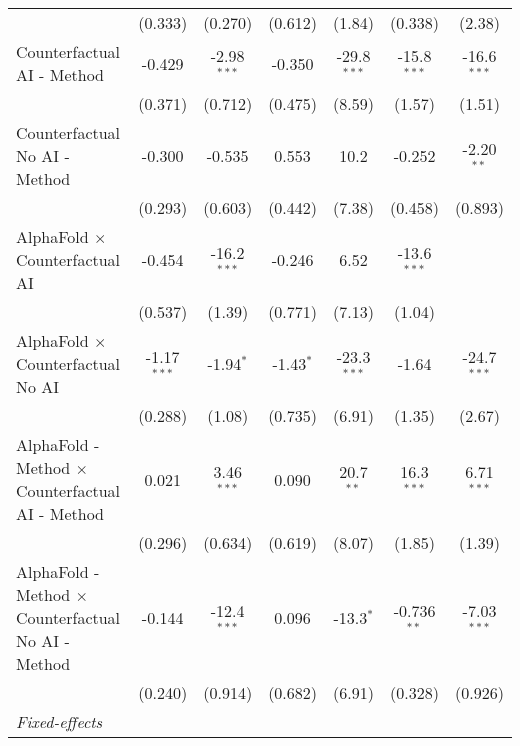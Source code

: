 \begin{tabular}{lcccccc}
                                                              & (0.333)       & (0.270)       & (0.612)     & (1.84)        & (0.338)       & (2.38)\\   
   Counterfactual AI - Method                                 & -0.429        & -2.98$^{***}$ & -0.350      & -29.8$^{***}$ & -15.8$^{***}$ & -16.6$^{***}$\\   
                                                              & (0.371)       & (0.712)       & (0.475)     & (8.59)        & (1.57)        & (1.51)\\   
   Counterfactual No AI - Method                              & -0.300        & -0.535        & 0.553       & 10.2          & -0.252        & -2.20$^{**}$\\   
                                                              & (0.293)       & (0.603)       & (0.442)     & (7.38)        & (0.458)       & (0.893)\\   
   AlphaFold $\times$ Counterfactual AI                       & -0.454        & -16.2$^{***}$ & -0.246      & 6.52          & -13.6$^{***}$ &   \\   
                                                              & (0.537)       & (1.39)        & (0.771)     & (7.13)        & (1.04)        &   \\   
   AlphaFold $\times$ Counterfactual No AI                    & -1.17$^{***}$ & -1.94$^{*}$   & -1.43$^{*}$ & -23.3$^{***}$ & -1.64         & -24.7$^{***}$\\   
                                                              & (0.288)       & (1.08)        & (0.735)     & (6.91)        & (1.35)        & (2.67)\\   
   AlphaFold - Method $\times$ Counterfactual AI - Method     & 0.021         & 3.46$^{***}$  & 0.090       & 20.7$^{**}$   & 16.3$^{***}$  & 6.71$^{***}$\\   
                                                              & (0.296)       & (0.634)       & (0.619)     & (8.07)        & (1.85)        & (1.39)\\   
   AlphaFold - Method $\times$ Counterfactual No AI - Method  & -0.144        & -12.4$^{***}$ & 0.096       & -13.3$^{*}$   & -0.736$^{**}$ & -7.03$^{***}$\\   
                                                              & (0.240)       & (0.914)       & (0.682)     & (6.91)        & (0.328)       & (0.926)\\   
   \midrule
   \emph{Fixed-effects}\\

\end{tabular}
